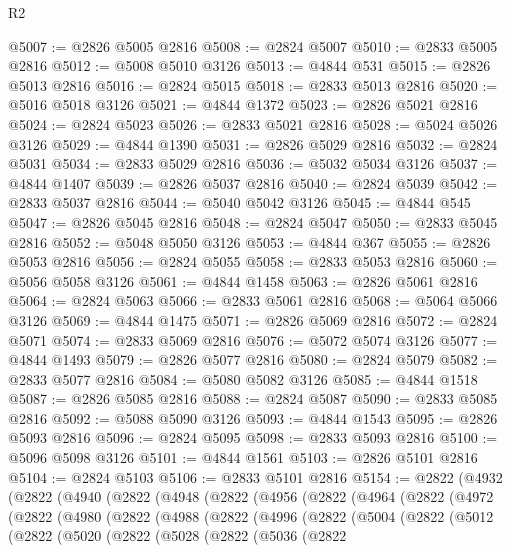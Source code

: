 \begin{lexlean}{R2}
\begin{coremodule}
@5007 := @2826 @5005 @2816
@5008 := @2824 @5007
@5010 := @2833 @5005 @2816
@5012 := @5008 @5010 @3126
@5013 := @4844 @531
@5015 := @2826 @5013 @2816
@5016 := @2824 @5015
@5018 := @2833 @5013 @2816
@5020 := @5016 @5018 @3126
@5021 := @4844 @1372
@5023 := @2826 @5021 @2816
@5024 := @2824 @5023
@5026 := @2833 @5021 @2816
@5028 := @5024 @5026 @3126
@5029 := @4844 @1390
@5031 := @2826 @5029 @2816
@5032 := @2824 @5031
@5034 := @2833 @5029 @2816
@5036 := @5032 @5034 @3126
@5037 := @4844 @1407
@5039 := @2826 @5037 @2816
@5040 := @2824 @5039
@5042 := @2833 @5037 @2816
@5044 := @5040 @5042 @3126
@5045 := @4844 @545
@5047 := @2826 @5045 @2816
@5048 := @2824 @5047
@5050 := @2833 @5045 @2816
@5052 := @5048 @5050 @3126
@5053 := @4844 @367
@5055 := @2826 @5053 @2816
@5056 := @2824 @5055
@5058 := @2833 @5053 @2816
@5060 := @5056 @5058 @3126
@5061 := @4844 @1458
@5063 := @2826 @5061 @2816
@5064 := @2824 @5063
@5066 := @2833 @5061 @2816
@5068 := @5064 @5066 @3126
@5069 := @4844 @1475
@5071 := @2826 @5069 @2816
@5072 := @2824 @5071
@5074 := @2833 @5069 @2816
@5076 := @5072 @5074 @3126
@5077 := @4844 @1493
@5079 := @2826 @5077 @2816
@5080 := @2824 @5079
@5082 := @2833 @5077 @2816
@5084 := @5080 @5082 @3126
@5085 := @4844 @1518
@5087 := @2826 @5085 @2816
@5088 := @2824 @5087
@5090 := @2833 @5085 @2816
@5092 := @5088 @5090 @3126
@5093 := @4844 @1543
@5095 := @2826 @5093 @2816
@5096 := @2824 @5095
@5098 := @2833 @5093 @2816
@5100 := @5096 @5098 @3126
@5101 := @4844 @1561
@5103 := @2826 @5101 @2816
@5104 := @2824 @5103
@5106 := @2833 @5101 @2816
@5154 := @2822
    (@4932
      (@2822
        (@4940
          (@2822
            (@4948
              (@2822
                (@4956
                  (@2822
                    (@4964
                      (@2822
                        (@4972
                          (@2822
                            (@4980
                              (@2822
                                (@4988
                                  (@2822
                                    (@4996
                                      (@2822
                                        (@5004
                                          (@2822
                                            (@5012
                                              (@2822
                                                (@5020
                                                  (@2822
                                                    (@5028
                                                      (@2822
                                                        (@5036
                                                          (@2822

\end{coremodule}
\end{lexlean}
